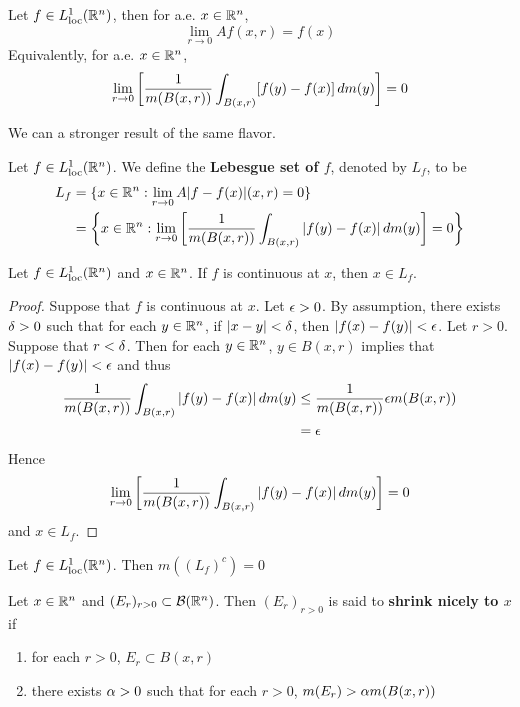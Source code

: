 \documentclass{book}
\begin{document}
	\begin{thm}
		Let $f \in L^1_{\text{loc}}(\mathbb{R}^n)$, then for a.e. $x \in \mathbb{R}^n$, $$\lim_{r \rightarrow 0} Af(x,r) =f(x)$$ 
		Equivalently, for a.e. $x \in \mathbb{R}^n$, $$ \lim_{r \rightarrow 0} \bigg[ \frac{1}{m(B(x,r))}\int_{B(x,r)}[f(y)-f(x)]\, d m(y)\bigg] =0$$
	\end{thm}
	
	\begin{note}
		We can a stronger result of the same flavor.
	\end{note}
	
	\begin{defn}  
		Let $f \in L^1_{\text{loc}}(\mathbb{R}^n)$. We define the \textbf{Lebesgue set of $f$}, denoted by $L_f$, to be 
		\begin{align*}
			L_f 
			&= \{x \in \mathbb{R}^n: \lim_{r \rightarrow 0} A|f-f(x)|(x,r) =0 \}\\
			&= \bigg \{x \in \mathbb{R}^n: \lim_{r \rightarrow 0} \bigg[ \frac{1}{m(B(x,r))}\int_{B(x,r)}|f(y) - f(x)|\, d m(y)\bigg] =0 \bigg \}
		\end{align*}
	\end{defn}
	
	\begin{ex}  
		Let $f \in L^1_{\text{loc}}(\mathbb{R}^n)$ and $x \in \mathbb{R}^n$. If $f$ is continuous at $x$, then $x \in L_f$.
	\end{ex}
	
	\begin{proof}
		Suppose that $f$ is continuous at $x$. Let $\epsilon > 0$. By assumption, there exists $\delta >0$ such that for each $y \in \mathbb{R}^n$, if $|x-y|< \delta$, then $|f(x)-f(y)| < \epsilon$. Let $r >0$. Suppose that $r< \delta$. Then for each $y \in \mathbb{R}^n$, $y \in B(x,r)$ implies that $|f(x) - f(y)| < \epsilon$ and thus 
		\begin{align*}
			\frac{1}{m(B(x,r))}\int_{B(x,r)}|f(y) - f(x)|\, d m(y)
			& \leq \frac{1}{m(B(x,r))} \epsilon m(B(x,r))\\
			&=\epsilon
		\end{align*}
		Hence $$\lim_{r \rightarrow 0} \bigg[ \frac{1}{m(B(x,r))}\int_{B(x,r)}|f(y) - f(x)|\, d m(y)\bigg] =0$$ 
		and $x \in L_f$.
	\end{proof}
	
	\begin{thm}
		Let $f \in L^1_{\text{loc}}(\mathbb{R}^n)$. Then $m((L_f)^c) = 0$
	\end{thm}
	
	\begin{defn}  
		Let $x \in \mathbb{R}^n$ and $(E_r)_{r>0} \subset \mathcal{B}(\mathbb{R}^n)$. Then $(E_r)_{r>0}$ is said to \textbf{shrink nicely to $x$} if 
		
		\begin{enumerate}
			\item for each $r>0$, $E_r \subset B(x,r)$
			\item there exists $\alpha >0$ such that for each $r>0$, $m(E_r)> \alpha m(B(x,r))$
		\end{enumerate} 
	\end{defn}
	
\end{document}
